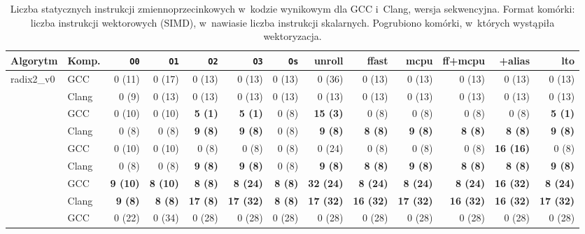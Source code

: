 \begin{table}[H]
\centering
\caption{Liczba statycznych instrukcji zmiennoprzecinkowych w~kodzie wynikowym
         dla GCC i~Clang, wersja sekwencyjna. Format komórki: liczba instrukcji
         wektorowych (SIMD), w~nawiasie liczba instrukcji skalarnych.
         Pogrubiono komórki, w~których wystąpiła wektoryzacja.}
\label{tab:simd-skal-gcc}
\scriptsize
\setlength{\tabcolsep}{2.0pt}
\begin{tabular}{llrrrrrrrrrrr}
\toprule
Algorytm & Komp. & \texttt{O0} & \texttt{O1} & \texttt{O2} & \texttt{O3} & \texttt{Os} & unroll & ffast & mcpu & ff+mcpu & +alias & lto \\
\midrule
\multirow{2}{*}{radix2\_v0}
  & GCC   & 0 (11) & 0 (17) & 0 (13) & 0 (13) & 0 (13) & 0 (36) & 0 (13) & 0 (13) & 0 (13) & 0 (13) & 0 (13) \\
  & Clang & 0 (9)  & 0 (13) & 0 (13) & 0 (13) & 0 (13) & 0 (13) & 0 (13) & 0 (13) & 0 (13) & 0 (13) & 0 (13) \\
\addlinespace
\multirow{2}{*}{radix2\_v1}
  & GCC   & 0 (10) & 0 (10) & \textbf{5 (1)} & \textbf{5 (1)} & 0 (8) & \textbf{15 (3)} & 0 (8) & 0 (8) & 0 (8) & 0 (8) & \textbf{5 (1)} \\
  & Clang & 0 (8)  & 0 (8)  & \textbf{9 (8)} & \textbf{9 (8)} & 0 (8) & \textbf{9 (8)}  & \textbf{8 (8)} & \textbf{9 (8)} & \textbf{8 (8)} & \textbf{8 (8)} & \textbf{9 (8)} \\
\addlinespace
\multirow{2}{*}{radix2\_v2\_soa}
  & GCC   & 0 (10) & 0 (10) & 0 (8) & 0 (8) & 0 (8) & 0 (24) & 0 (8) & 0 (8) & 0 (8) & \textbf{16 (16)} & 0 (8) \\
  & Clang & 0 (8)  & 0 (8)  & \textbf{9 (8)} & \textbf{9 (8)} & 0 (8) & \textbf{9 (8)} & \textbf{8 (8)} & \textbf{9 (8)} & \textbf{8 (8)} & \textbf{8 (8)} & \textbf{9 (8)} \\
\addlinespace
\multirow{2}{*}{radix2\_v3\_neon}
  & GCC   & \textbf{9 (10)} & \textbf{8 (10)} & \textbf{8 (8)} & \textbf{8 (24)} & \textbf{8 (8)} & \textbf{32 (24)} & \textbf{8 (24)} & \textbf{8 (24)} & \textbf{8 (24)} & \textbf{16 (32)} & \textbf{8 (24)} \\
  & Clang & \textbf{9 (8)}  & \textbf{8 (8)}  & \textbf{17 (8)} & \textbf{17 (32)} & \textbf{8 (8)} & \textbf{17 (32)} & \textbf{16 (32)} & \textbf{17 (32)} & \textbf{16 (32)} & \textbf{16 (32)} & \textbf{17 (32)} \\
\addlinespace
\multirow{2}{*}{radix4}
  & GCC   & 0 (22) & 0 (34) & 0 (28) & 0 (28) & 0 (28) & 0 (28) & 0 (28) & 0 (28) & 0 (28) & 0 (28) & 0 (28) \\

\end{tabular}
\end{table}
